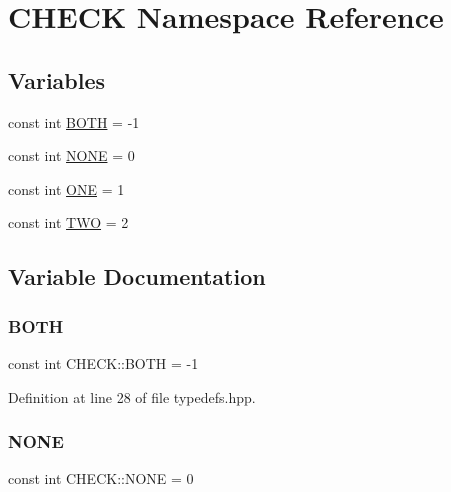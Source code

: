 \hypertarget{namespace_c_h_e_c_k}{}\section{C\+H\+E\+CK Namespace Reference}
\label{namespace_c_h_e_c_k}
\subsection*{Variables}
\begin{DoxyCompactItemize}
\item 
const int \hyperlink{namespace_c_h_e_c_k_a3acda1c74bfabb5b6b67e19d0ad2d52a}{B\+O\+TH} = -\/1
\item 
const int \hyperlink{namespace_c_h_e_c_k_a35fad085a9d64167bd4550445c4dc9e1}{N\+O\+NE} = 0
\item 
const int \hyperlink{namespace_c_h_e_c_k_acf8ecf93ddfb75456112712630f8f722}{O\+NE} = 1
\item 
const int \hyperlink{namespace_c_h_e_c_k_a2b112aaec4c59311376a5a60f291aa48}{T\+WO} = 2
\end{DoxyCompactItemize}


\subsection{Variable Documentation}
\mbox{\label{namespace_c_h_e_c_k_a3acda1c74bfabb5b6b67e19d0ad2d52a}} 
\subsubsection{\texorpdfstring{B\+O\+TH}{BOTH}}
{\footnotesize\ttfamily const int C\+H\+E\+C\+K\+::\+B\+O\+TH = -\/1}



Definition at line 28 of file typedefs.\+hpp.

\mbox{\label{namespace_c_h_e_c_k_a35fad085a9d64167bd4550445c4dc9e1}} 
\subsubsection{\texorpdfstring{N\+O\+NE}{NONE}}
{\footnotesize\ttfamily const int C\+H\+E\+C\+K\+::\+N\+O\+NE = 0}



